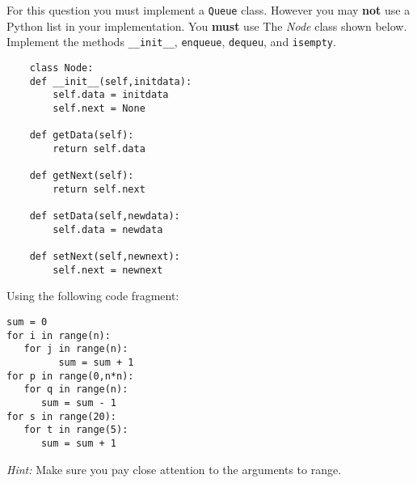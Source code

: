 \documentclass[11pt]{exam}
\begin{document}
\begin{questions}
\newpage

\question[10] For this question you must implement a \texttt{Queue} class.  However you may \textbf{not} use a Python list in your implementation.  You \textbf{must} use The \textit{Node}  class shown below.   Implement the methods \verb!__init__!, \texttt{enqueue}, \texttt{dequeu}, and \texttt{isempty}.
\begin{verbatim}
	class Node:
    def __init__(self,initdata):
        self.data = initdata
        self.next = None

    def getData(self):
        return self.data

    def getNext(self):
        return self.next

    def setData(self,newdata):
        self.data = newdata

    def setNext(self,newnext):
        self.next = newnext
\end{verbatim}

\newpage




\question Using the following code fragment:
\begin{lstlisting}
sum = 0
for i in range(n):
   for j in range(n):
         sum = sum + 1
for p in range(0,n*n):
   for q in range(n):
      sum = sum - 1
for s in range(20):
   for t in range(5):
      sum = sum + 1
\end{lstlisting}
\emph{Hint:}  Make sure you pay close attention to the arguments to range.



\end{questions}
\end{document}
